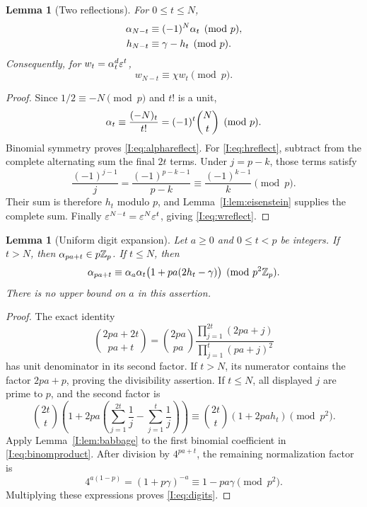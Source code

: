 \documentclass[11pt,letterpaper]{article}
\newtheorem{lemma}[theorem]{Lemma}
\theoremstyle{definition}
\theoremstyle{remark}
\begin{document}
\begin{lemma}[Two reflections]\label{I:lem:reflections}
For $0\le t\le N$,
\begin{align}
 \alpha_{N-t}&\equiv(-1)^N\alpha_t\pmod p,\label{I:eq:alphareflect}\\
 h_{N-t}&\equiv\gamma-h_t\pmod p.\label{I:eq:hreflect}
\end{align}
Consequently, for $w_t=\alpha_t^d\varepsilon^t$,
\begin{equation}\label{I:eq:wreflect}
 w_{N-t}\equiv\chi w_t\pmod p.
\end{equation}
\end{lemma}
\begin{proof}
Since $1/2\equiv-N\pmod p$ and $t!$ is a unit,
\[
 \alpha_t\equiv\frac{(-N)_t}{t!}
            =(-1)^t\binom Nt\pmod p.
\]
Binomial symmetry proves \eqref{I:eq:alphareflect}.
For \eqref{I:eq:hreflect}, subtract from the complete alternating sum
the final $2t$ terms.  Under $j=p-k$, those terms satisfy
\[
 \frac{(-1)^{j-1}}j
 =\frac{(-1)^{p-k-1}}{p-k}
 \equiv\frac{(-1)^{k-1}}k\pmod p.
\]
Their sum is therefore $h_t$ modulo $p$, and
Lemma~\ref{I:lem:eisenstein} supplies the complete sum.
Finally $\varepsilon^{N-t}=\varepsilon^N\varepsilon^t$, giving \eqref{I:eq:wreflect}.
\end{proof}

\begin{lemma}[Uniform digit expansion]\label{I:lem:digits}
Let $a\ge0$ and $0\le t<p$ be integers.  If $t>N$, then
$\alpha_{pa+t}\in p\mathbb Z_p$.  If $t\le N$, then
\begin{equation}\label{I:eq:digits}
 \alpha_{pa+t}\equiv
 \alpha_a\alpha_t\bigl(1+pa(2h_t-\gamma)\bigr)\pmod{p^2\mathbb Z_p}.
\end{equation}
There is no upper bound on $a$ in this assertion.
\end{lemma}
\begin{proof}
The exact identity
\begin{equation}\label{I:eq:binomproduct}
 \binom{2pa+2t}{pa+t}
 =\binom{2pa}{pa}
   \frac{\prod_{j=1}^{2t}(2pa+j)}{\prod_{j=1}^t(pa+j)^2}
\end{equation}
has unit denominator in its second factor.  If $t>N$, its numerator
contains the factor $2pa+p$, proving the divisibility assertion.
If $t\le N$, all displayed $j$ are prime to $p$, and the second factor
is
\[
 \binom{2t}{t}
 \left(1+2pa\left(\sum_{j=1}^{2t}\frac1j
                         -\sum_{j=1}^{t}\frac1j\right)\right)
 \equiv\binom{2t}{t}(1+2pa h_t)\pmod{p^2}.
\]
Apply Lemma~\ref{I:lem:babbage} to the first binomial coefficient in
\eqref{I:eq:binomproduct}.  After division by $4^{pa+t}$, the remaining
normalization factor is
\[
 4^{a(1-p)}=(1+p\gamma)^{-a}\equiv1-pa\gamma\pmod{p^2}.
\]
Multiplying these expressions proves \eqref{I:eq:digits}.
\end{proof}
\end{document}
